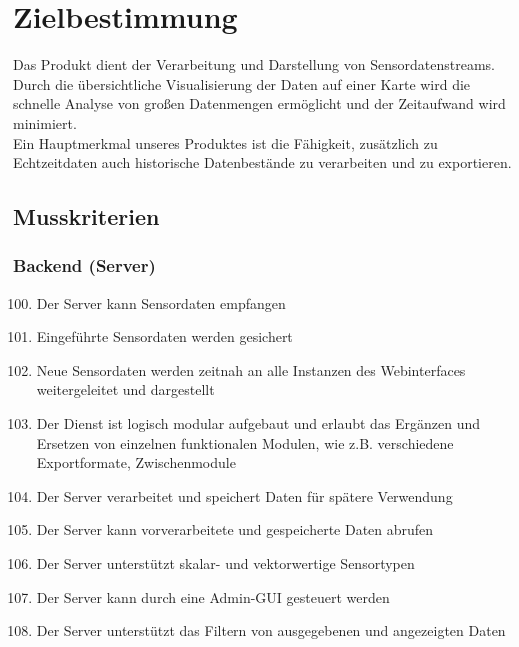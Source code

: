 \chapter{Zielbestimmung}
Das Produkt dient der Verarbeitung und Darstellung von Sensordatenstreams. Durch die übersichtliche Visualisierung der Daten auf einer Karte wird die schnelle Analyse von großen Datenmengen ermöglicht und der Zeitaufwand wird minimiert.\\
Ein Hauptmerkmal unseres Produktes ist die Fähigkeit, zusätzlich zu Echtzeitdaten auch historische Datenbestände zu verarbeiten und zu exportieren.
\section{Musskriterien}
\subsection{Backend (Server)}
\begin{enumerate}[label=\textbf{MK\arabic{enumi}0}]
	\setcounter{enumi}{99}
	\item Der Server kann Sensordaten empfangen
	\item Eingeführte Sensordaten werden gesichert
	\item Neue Sensordaten werden zeitnah an alle Instanzen des Webinterfaces weitergeleitet und dargestellt
	\item Der Dienst ist logisch modular aufgebaut und erlaubt das Ergänzen und Ersetzen von einzelnen funktionalen Modulen, wie z.B. verschiedene Exportformate, Zwischenmodule
	\item Der Server verarbeitet und speichert Daten für spätere Verwendung
	\item Der Server kann vorverarbeitete und gespeicherte Daten abrufen
	\item Der Server unterstützt skalar- und vektorwertige Sensortypen
	\item Der Server kann durch eine Admin-GUI gesteuert werden
	\item Der Server unterstützt das Filtern von ausgegebenen und angezeigten Daten
\end{enumerate}
